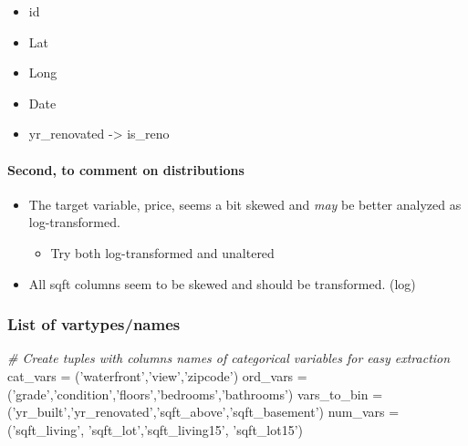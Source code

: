 \documentclass[11pt]{article}
\providecommand{\tightlist}{%
      \setlength{\itemsep}{0pt}\setlength{\parskip}{0pt}}
\newenvironment{Shaded}{}{}
\newcommand{\StringTok}[1]{\textcolor[rgb]{0.25,0.44,0.63}{{#1}}}
\newcommand{\CommentTok}[1]{\textcolor[rgb]{0.38,0.63,0.69}{\textit{{#1}}}}
\newcommand{\NormalTok}[1]{{#1}}
\newcommand{\OperatorTok}[1]{\textcolor[rgb]{0.40,0.40,0.40}{{#1}}}
\begin{document}
\begin{itemize}
  \begin{itemize}
  \tightlist
  \item
    id
  \item
    Lat
  \item
    Long
  \item
    Date
  \item
    yr\_renovated -\textgreater{} is\_reno
  \end{itemize}
\end{itemize}

\hypertarget{second-to-comment-on-distributions}{%
\paragraph{Second, to comment on
distributions}\label{second-to-comment-on-distributions}}

\begin{itemize}
\tightlist
\item
  The target variable, price, seems a bit skewed and \emph{may} be
  better analyzed as log-transformed.

  \begin{itemize}
  \tightlist
  \item
    Try both log-transformed and unaltered
  \end{itemize}
\item
  All sqft columns seem to be skewed and should be transformed. (log)
\end{itemize}

    \hypertarget{list-of-vartypesnames}{%
\subsubsection{List of vartypes/names}\label{list-of-vartypesnames}}

    \begin{Shaded}
\begin{Highlighting}[]
\CommentTok{# Create tuples with columns names of categorical variables for easy extraction }
\NormalTok{cat_vars }\OperatorTok{=}\NormalTok{ (}\StringTok{'waterfront'}\NormalTok{,}\StringTok{'view'}\NormalTok{,}\StringTok{'zipcode'}\NormalTok{)}
\NormalTok{ord_vars }\OperatorTok{=}\NormalTok{ (}\StringTok{'grade'}\NormalTok{,}\StringTok{'condition'}\NormalTok{,}\StringTok{'floors'}\NormalTok{,}\StringTok{'bedrooms'}\NormalTok{,}\StringTok{'bathrooms'}\NormalTok{)}
\NormalTok{vars_to_bin }\OperatorTok{=}\NormalTok{ (}\StringTok{'yr_built'}\NormalTok{,}\StringTok{'yr_renovated'}\NormalTok{,}\StringTok{'sqft_above'}\NormalTok{,}\StringTok{'sqft_basement'}\NormalTok{)}
\NormalTok{num_vars }\OperatorTok{=}\NormalTok{ (}\StringTok{'sqft_living'}\NormalTok{, }\StringTok{'sqft_lot'}\NormalTok{,}\StringTok{'sqft_living15'}\NormalTok{, }\StringTok{'sqft_lot15'}\NormalTok{)}
\end{Highlighting}
\end{Shaded}
\end{document}
